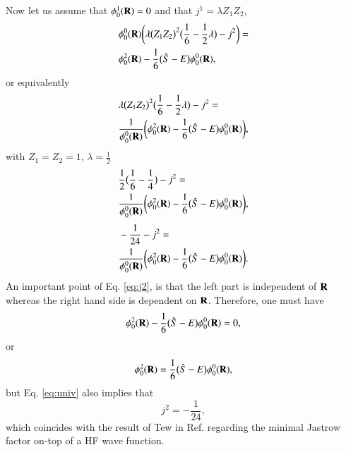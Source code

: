 \documentclass[aip,jcp,reprint,noshowkeys,superscriptaddress]{revtex4-1}
\newcommand{\bd}[1]{{\bf {#1}}}
\begin{document}
Now let us assume that $\phi_0^1(\bd{R}) = 0$ and that $j^1 = \lambda Z_1 Z_2$, 
\begin{equation}
  \begin{aligned}
& \phi_0^0(\bd{R}) \bigg( \lambda \big(Z_1 Z_2\big)^2 \big( \frac{1}{6} - \frac{1}{2} \lambda\big) - j^2 \bigg) = \\
& \phi_0^2(\bd{R}) - \frac{1}{6}\big( \hat{S} -E \big) \phi_0^0(\bd{R}) ,
  \end{aligned}
\end{equation}
or equivalently
\begin{equation}
  \begin{aligned}
& \lambda \big(Z_1 Z_2\big)^2 \big( \frac{1}{6} - \frac{1}{2} \lambda\big) - j^2  = \\
& \frac{1}{\phi_0^0(\bd{R})} \bigg( \phi_0^2(\bd{R}) - \frac{1}{6}\big( \hat{S} -E \big) \phi_0^0(\bd{R}) \bigg) ,
  \end{aligned}
\end{equation}
with $Z_1 = Z_2 = 1$, $\lambda = \frac{1}{2}$ 
\begin{equation}
  \begin{aligned}
& \frac{1}{2}\big( \frac{1}{6} - \frac{1}{4} \big) - j^2  = \\
& \frac{1}{\phi_0^0(\bd{R})} \bigg( \phi_0^2(\bd{R}) - \frac{1}{6}\big( \hat{S} -E \big) \phi_0^0(\bd{R}) \bigg) ,
  \end{aligned}
\end{equation}
\begin{equation}
 \label{eq:j2}
  \begin{aligned}
& -\frac{1}{24} - j^2  = \\
& \frac{1}{\phi_0^0(\bd{R})} \bigg( \phi_0^2(\bd{R}) - \frac{1}{6}\big( \hat{S} -E \big) \phi_0^0(\bd{R}) \bigg) .
  \end{aligned}
\end{equation}
An important point of Eq. \eqref{eq:j2}, is that the left part is independent of $\bd{R}$ whereas the right hand side is dependent on $\bd{R}$. Therefore, one must have
\begin{equation}
 \label{eq:univ}
 \phi_0^2(\bd{R}) - \frac{1}{6}\big( \hat{S} -E \big) \phi_0^0(\bd{R}) = 0, 
\end{equation}
or 
\begin{equation}
 \label{eq:phi02}
 \phi_0^2(\bd{R}) = \frac{1}{6}\big( \hat{S} -E \big) \phi_0^0(\bd{R}), 
\end{equation}
but Eq. \eqref{eq:univ} also implies that 
\begin{equation}
 \label{eq:j02}
 j^2 = -\frac{1}{24},
\end{equation}
which coincides with the result of Tew in Ref.  regarding the minimal Jastrow factor on-top of a HF wave function. 
\end{document}
